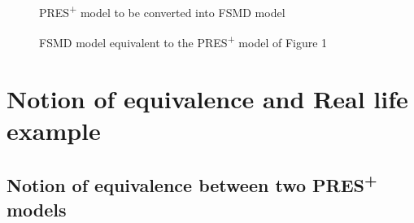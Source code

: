 \documentclass[9pt,executive]{article}
\def\presp{PRES\textsuperscript{+}}
\def\fsmd{FSMD}
\def\presp{PRES\textsuperscript{+}}
\def\fsmd{FSMD}
\begin{document}
\begin{figure}[htbp]
\centerline{}
\caption{{\presp} model to be converted into {\fsmd} model}
\end{figure}
            
\begin{figure}[htbp]
\centerline{}
\caption{{\fsmd} model equivalent to the {\presp} model of Figure 1}

\end{figure}
 
\section{Notion of equivalence and Real life example} \label{real life example}

\subsection{Notion of equivalence between two {\presp} models}
\end{document}
